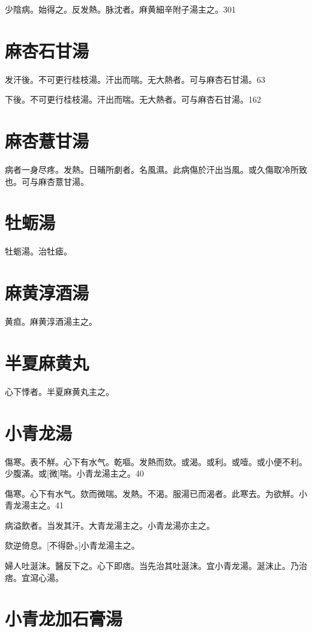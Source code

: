 \documentclass[12pt,oneside,UTF8,b5paper]{ctexbook}她她她她她她她
\begin{document}
少陰病。始得之。反发熱。脉沈者。麻黄細辛附子湯主之。301

\section{麻杏石甘湯}

发汗後。不可更行桂枝湯。汗出而喘。无大熱者。可与麻杏石甘湯。63

下後。不可更行桂枝湯。汗出而喘。无大熱者。可与麻杏石甘湯。162

\section{麻杏薏甘湯}

病者一身尽疼。发熱。日晡所劇者。名風濕。此病傷於汗出当風。或久傷取冷所致也。可与麻杏薏甘湯。

\section{牡蛎湯}

牡蛎湯。治牡瘧。

\section{麻黄淳酒湯}

黄疸。麻黄淳酒湯主之。

\section{半夏麻黄丸}

心下悸者。半夏麻黄丸主之。

\section{小青龙湯}

傷寒。表不觧。心下有水气。乾嘔。发熱而欬。或渴。或利。或噎。或小便不利。少腹滿。或[微]喘。小青龙湯主之。40

傷寒。心下有水气。欬而微喘。发熱。不渴。服湯已而渴者。此寒去。为欲觧。小青龙湯主之。41

病溢飲者。当发其汗。大青龙湯主之。小青龙湯亦主之。

欬逆倚息。[不得卧。]小青龙湯主之。

婦人吐涎沫。醫反下之。心下即痞。当先治其吐涎沫。宜小青龙湯。涎沫止。乃治痞。宜瀉心湯。

\section{小青龙加石膏湯}
\end{document}
